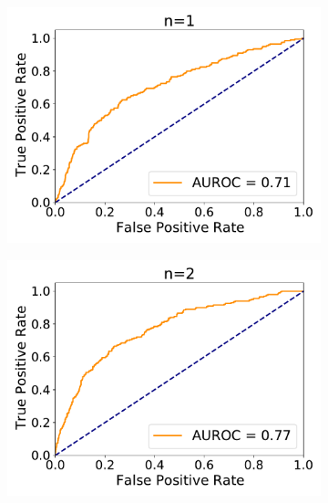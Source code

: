 \begin{figure}[htb]
	\begin{subfigure}{.33\textwidth}
		\centering
		\includegraphics[width=1\linewidth]{figures/roc_particleFilter/AUROC_2000samples_class0_llh_n1}
		\caption{}
		\label{fig:roc_part_n1}
	\end{subfigure}%
	\begin{subfigure}{.33\textwidth}
		\centering
		\includegraphics[width=1\linewidth]{figures/roc_particleFilter/AUROC_2000samples_class0_llh_n2}
		\caption{}
		\label{fig:roc_part_n2}
	\end{subfigure}
	\begin{subfigure}{.33\textwidth}
		\centering

\end{subfigure}
\end{figure}
